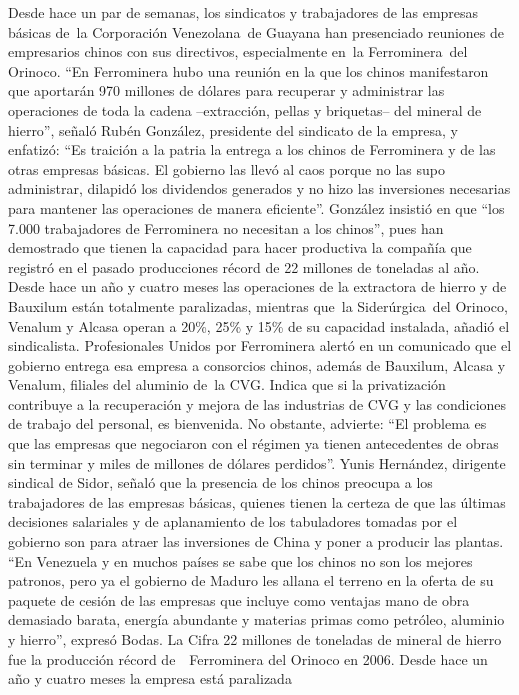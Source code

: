 \documentclass{article}%
\begin{document}
\newline%
%
Desde hace un par de semanas, los sindicatos y trabajadores de las empresas básicas de~la Corporación Venezolana~de Guayana han presenciado reuniones de empresarios chinos con sus directivos, especialmente en~la Ferrominera~del Orinoco.%
\newline%
%
“En Ferrominera hubo una reunión en la que los chinos manifestaron que aportarán 970 millones de dólares para recuperar y administrar las operaciones de toda la cadena –extracción, pellas y briquetas– del mineral de hierro”, señaló Rubén González, presidente del sindicato de la empresa, y enfatizó: “Es traición a la patria la entrega a los chinos de Ferrominera y de las otras empresas básicas. El gobierno las llevó al caos porque no las supo administrar, dilapidó los dividendos generados y no hizo las inversiones necesarias para mantener las operaciones de manera eficiente”.%
\newline%
%
González insistió en que “los 7.000 trabajadores de Ferrominera no necesitan a los chinos”, pues han demostrado que tienen la capacidad para hacer productiva la compañía que registró en el pasado producciones récord de 22 millones de toneladas al año.%
\newline%
%
Desde hace un año y cuatro meses las operaciones de la extractora de hierro y de Bauxilum están totalmente paralizadas, mientras que~la Siderúrgica~del Orinoco, Venalum y Alcasa operan a 20\%, 25\% y 15\% de su capacidad instalada, añadió el sindicalista.%
\newline%
%
Profesionales Unidos por Ferrominera alertó en un comunicado que el gobierno entrega esa empresa a consorcios chinos, además de Bauxilum, Alcasa y Venalum, filiales del aluminio de~la CVG.%
\newline%
%
Indica que si la privatización contribuye a la recuperación y mejora de las industrias de CVG y las condiciones de trabajo del personal, es bienvenida. No obstante, advierte: “El problema es que las empresas que negociaron con el régimen ya tienen antecedentes de obras sin terminar y miles de millones de dólares perdidos”.%
\newline%
%
Yunis Hernández, dirigente sindical de Sidor, señaló que la presencia de los chinos preocupa a los trabajadores de las empresas básicas, quienes tienen la certeza de que las últimas decisiones salariales y de aplanamiento de los tabuladores tomadas por el gobierno son para atraer las inversiones de China y poner a producir las plantas.%
\newline%
%
“En Venezuela y en muchos países se sabe que los chinos no son los mejores patronos, pero ya el gobierno de Maduro les allana el terreno en la oferta de su paquete de cesión de las empresas que incluye como ventajas mano de obra demasiado barata, energía abundante y materias primas como petróleo, aluminio y hierro”, expresó Bodas.%
\newline%
%
La Cifra%
\newline%
%
22 millones de toneladas de mineral de hierro fue la producción récord de~~Ferrominera del Orinoco en 2006. Desde hace un año y cuatro meses la empresa está paralizada%
\newline%
%
\end{document}
